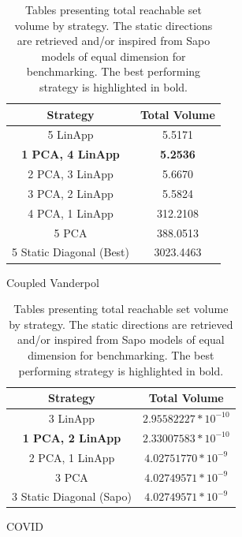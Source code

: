 \begin{table}[h!]
    \hspace{1em}
    \begin{subtable}[h]{0.45\textwidth}
         \centering
         \begin{tabular}{|c|c|}
         \hline
         Strategy & Total  Volume \\
         \hline
         5 LinApp & 5.5171 \\
         \hline
         {\bf 1 PCA, 4 LinApp } & {\bf 5.2536} \\
         \hline
         2 PCA, 3 LinApp  & 5.6670\\
         \hline
         3 PCA, 2 LinApp  & 5.5824\\
         \hline
         4 PCA, 1 LinApp  & 312.2108 \\
         \hline
         5 PCA  & 388.0513 \\
         \hline
         5 Static Diagonal (Best) & 3023.4463  \\
         \hline
        \end{tabular}
        \caption{Coupled Vanderpol}
        \label{tab:sirvol}
     \end{subtable}\hspace{1 em}
    \begin{subtable}[h]{0.45\textwidth}
         \centering
         \begin{tabular}{|c|c|}
         \hline
         Strategy & Total  Volume \\
         \hline
         3 LinApp & $2.95582227 * 10^{-10}$ \\
         \hline
         {\bf 1 PCA, 2 LinApp } & {\bf $2.33007583 * 10^{-10}$}\\
         \hline
         2 PCA, 1 LinApp &$ 4.02751770 * 10^{-9}$\\
         \hline
         3 PCA & $4.02749571 * 10^{-9}$\\
         \hline
         3 Static Diagonal (Sapo) & $4.02749571 * 10^{-9}$\\
         \hline
        \end{tabular}
        \caption{COVID}
        \label{tab:covidvol}
     \end{subtable}
 \caption{Tables presenting total reachable set volume by strategy. The static directions are retrieved and/or inspired from Sapo models of equal dimension for benchmarking. The best performing strategy is highlighted in bold.}
     \label{tab:voltable}
\end{table}
\newpage
